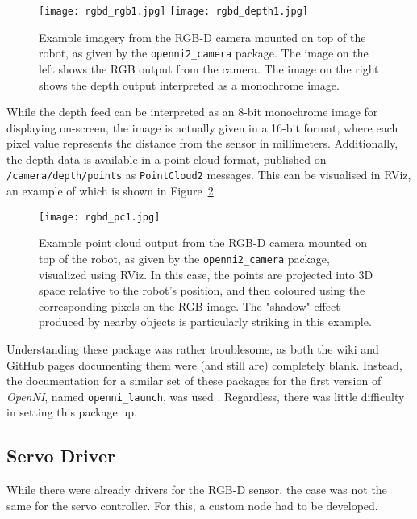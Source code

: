 \begin{figure}[h!]
    \centering
    \texttt{[image: rgbd\_rgb1.jpg]}
    \texttt{[image: rgbd\_depth1.jpg]}
    \caption{Example imagery from the RGB-D camera mounted on top of the robot, as given by the \texttt{openni2\_camera} package. The image on the left shows the RGB output from the camera. The image on the right shows the depth output interpreted as a monochrome image.}
    \label{fig:rgbd_images1}
\end{figure}

While the depth feed can be interpreted as an 8-bit monochrome image for displaying on-screen, the image is actually given in a 16-bit format, where each pixel value represents the distance from the sensor in millimeters. Additionally, the depth data is available in a point cloud format, published on \texttt{/camera/depth/points} as \texttt{PointCloud2} messages. This can be visualised in RViz, an example of which is shown in Figure~\ref{fig:rgbd_images2}.

\begin{figure}[h!]
    \centering
    \texttt{[image: rgbd\_pc1.jpg]}
    \caption{Example point cloud output from the RGB-D camera mounted on top of the robot, as given by the \texttt{openni2\_camera} package, visualized using RViz. In this case, the points are projected into 3D space relative to the robot's position, and then coloured using the corresponding pixels on the RGB image. The "shadow" effect produced by nearby objects is particularly striking in this example.}
    \label{fig:rgbd_images2}
\end{figure}

Understanding these package was rather troublesome, as both the wiki and GitHub pages documenting them were (and still are) completely blank. Instead, the documentation for a similar set of these packages for the first version of \emph{OpenNI}, named \texttt{openni\_launch}, was used \cite{ros_wiki_openni_launch}. Regardless, there was little difficulty in setting this package up.

\subsection{Servo Driver}

While there were already drivers for the RGB-D sensor, the case was not the same for the servo controller. For this, a custom node had to be developed.



